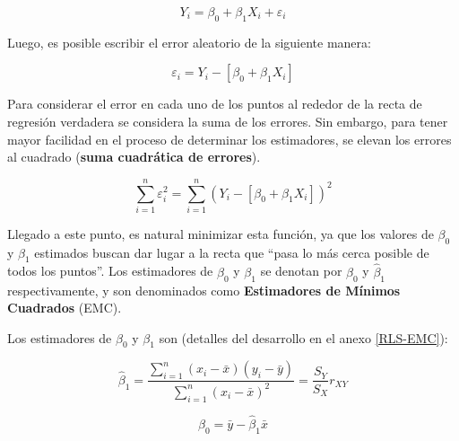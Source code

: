 \documentclass[
  11pt,
]{book}
\theoremstyle{definition}
\theoremstyle{definition}
\theoremstyle{definition}
\theoremstyle{definition}
\theoremstyle{remark}
\begin{document}
\[
Y_i = \beta_0 + \beta_1X_i + \varepsilon_i
\]

Luego, es posible escribir el error aleatorio de la siguiente manera:

\begin{equation}
\varepsilon_i = Y_i - [\beta_0 + \beta_1X_i]
\label{eq:funcion-errores}
\end{equation}

Para considerar el error en cada uno de los puntos al rededor de la recta de regresión verdadera se considera la suma de los errores. Sin embargo, para tener mayor facilidad en el proceso de determinar los estimadores, se elevan los errores al cuadrado (\textbf{suma cuadrática de errores}).

\begin{equation}
\sum_{i=1}^n\varepsilon_i^2 = \sum_{i=1}^n (Y_i - [\beta_0 + \beta_1X_i])^2
\label{eq:sumacuadratica-RL}
\end{equation}

Llegado a este punto, es natural minimizar esta función, ya que los valores de \(\beta_0\) y \(\beta_1\) estimados buscan dar lugar a la recta que ``pasa lo más cerca posible de todos los puntos''. Los estimadores de \(\beta_0\) y \(\beta_1\) se denotan por \(\widehat{\beta}_0\) y \(\widehat{\beta}_1\) respectivamente, y son denominados como \textbf{Estimadores de Mínimos Cuadrados} (EMC).

Los estimadores de \(\beta_0\) y \(\beta_1\) son (detalles del desarrollo en el anexo \ref{RLS-EMC}):

\begin{equation}
\widehat{\beta}_1 = \frac{\displaystyle\sum_{i=1}^n(x_i-\bar{x})(y_i-\bar{y})}{\displaystyle\sum_{i=1}^n(x_i-\bar{x})^2} = \frac{S_Y}{S_X}r_{XY}
\label{eq:beta1gorro}
\end{equation}

\begin{equation}
\widehat{\beta}_0 = \bar{y} - \widehat{\beta}_1\bar{x}
\label{eq:beta0gorro}
\end{equation}
\end{document}
